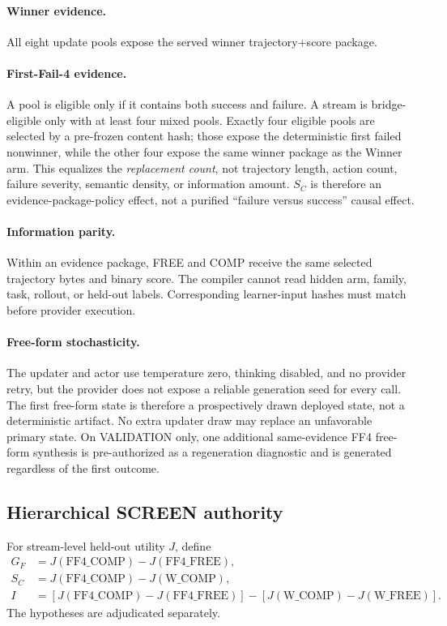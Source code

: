 \paragraph{Winner evidence.}
All eight update pools expose the served winner trajectory+score package.

\paragraph{First-Fail-4 evidence.}
A pool is eligible only if it contains both success and failure. A stream is bridge-eligible only with at least four mixed pools. Exactly four eligible pools are selected by a pre-frozen content hash; those expose the deterministic first failed nonwinner, while the other four expose the same winner package as the Winner arm. This equalizes the \emph{replacement count}, not trajectory length, action count, failure severity, semantic density, or information amount. $S_C$ is therefore an evidence-package-policy effect, not a purified ``failure versus success'' causal effect.

\paragraph{Information parity.}
Within an evidence package, FREE and COMP receive the same selected trajectory bytes and binary score. The compiler cannot read hidden arm, family, task, rollout, or held-out labels. Corresponding learner-input hashes must match before provider execution.

\paragraph{Free-form stochasticity.}
The updater and actor use temperature zero, thinking disabled, and no provider retry, but the provider does not expose a reliable generation seed for every call. The first free-form state is therefore a prospectively drawn deployed state, not a deterministic artifact. No extra updater draw may replace an unfavorable primary state. On VALIDATION only, one additional same-evidence FF4 free-form synthesis is pre-authorized as a regeneration diagnostic and is generated regardless of the first outcome.

\subsection{Hierarchical SCREEN authority}
For stream-level held-out utility $J$, define
\begin{align}
G_F &= J(\text{FF4\_COMP})-J(\text{FF4\_FREE}),\\
S_C &= J(\text{FF4\_COMP})-J(\text{W\_COMP}),\\
I &= [J(\text{FF4\_COMP})-J(\text{FF4\_FREE})]
 -[J(\text{W\_COMP})-J(\text{W\_FREE})].
\end{align}
The hypotheses are adjudicated separately.

